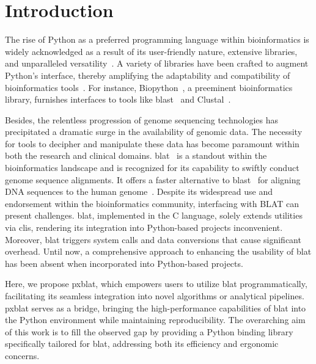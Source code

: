\section*{Introduction}\label{sec:introduction}

The rise of Python as a preferred programming language within bioinformatics is widely acknowledged as a result of its user-friendly nature, extensive libraries, and unparalleled versatility~\citep{perkel2015programming}.
A variety of libraries have been crafted to augment Python's interface, thereby amplifying the adaptability and compatibility of bioinformatics tools~\citep{putri2022analysing, cock2009biopython}.
For instance, Biopython~\citep{cock2009biopython}, a preeminent bioinformatics library, furnishes interfaces to tools like \gls{blast}~\citep{altschul1990basic} and Clustal~\citep{higgins1988clustal}.

Besides, the relentless progression of genome sequencing technologies has precipitated a dramatic surge in the availability of genomic data.
The necessity for tools to decipher and manipulate these data has become paramount within both the research and clinical domains.
\gls{blat}~\citep{kent2002blat} is a standout within the bioinformatics landscape and is recognized for its capability to swiftly conduct genome sequence alignments.
It offers a faster alternative to \gls{blast}~\citep{altschul1990basic} for aligning DNA sequences to the human genome~\citep{kent2002blat}.
Despite its widespread use and endorsement within the bioinformatics community, interfacing with BLAT can present challenges.
\gls{blat}, implemented in the C language, solely extends utilities via \glspl{cli}, rendering its integration into Python-based projects inconvenient.
Moreover, \gls{blat} triggers system calls and data conversions that cause significant overhead.
Until now, a comprehensive approach to enhancing the usability of \gls{blat} has been absent when incorporated into Python-based projects.

Here, we propose \gls{pxblat}, which empowers users to utilize \gls{blat} programmatically, facilitating its seamless integration into novel algorithms or analytical pipelines.
\gls{pxblat} serves as a bridge, bringing the high-performance capabilities of \gls{blat} into the Python environment while maintaining reproducibility.
The overarching aim of this work is to fill the observed gap by providing a Python binding library specifically tailored for \gls{blat}, addressing both its efficiency and ergonomic concerns.

